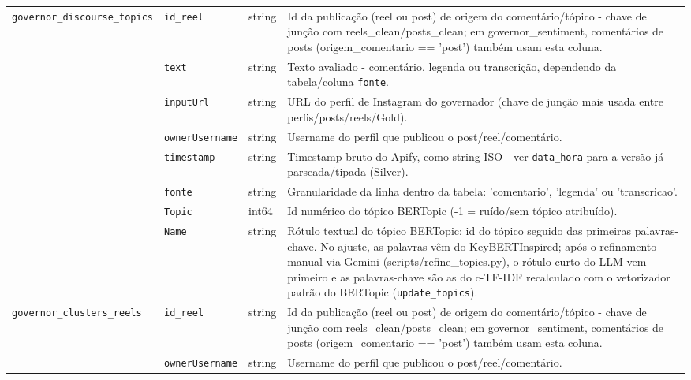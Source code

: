 \begin{footnotesize}
\begin{longtable}{p{3.2cm}p{3.0cm}p{2.0cm}p{6.0cm}}
\texttt{governor\_\allowbreak{}discourse\_\allowbreak{}topics} & \texttt{id\_\allowbreak{}reel} & string & Id da publicação (reel ou post) de origem do comentário/\allowbreak{}tópico - chave de junção com reels\_\allowbreak{}clean/\allowbreak{}posts\_\allowbreak{}clean; em governor\_\allowbreak{}sentiment, comentários de posts (origem\_\allowbreak{}comentario == 'post') também usam esta coluna. \\
\texttt{} & \texttt{text} & string & Texto avaliado - comentário, legenda ou transcrição, dependendo da tabela/\allowbreak{}coluna \texttt{fonte}. \\
\texttt{} & \texttt{inputUrl} & string & URL do perfil de Instagram do governador (chave de junção mais usada entre perfis/\allowbreak{}posts/\allowbreak{}reels/\allowbreak{}Gold). \\
\texttt{} & \texttt{ownerUsername} & string & Username do perfil que publicou o post/\allowbreak{}reel/\allowbreak{}comentário. \\
\texttt{} & \texttt{timestamp} & string & Timestamp bruto do Apify, como string ISO - ver \texttt{data\_\allowbreak{}hora} para a versão já parseada/\allowbreak{}tipada (Silver). \\
\texttt{} & \texttt{fonte} & string & Granularidade da linha dentro da tabela: 'comentario', 'legenda' ou 'transcricao'. \\
\texttt{} & \texttt{Topic} & int64 & Id numérico do tópico BERTopic (-1 = ruído/\allowbreak{}sem tópico atribuído). \\
\texttt{} & \texttt{Name} & string & Rótulo textual do tópico BERTopic: id do tópico seguido das primeiras palavras-chave. No ajuste, as palavras vêm do KeyBERTInspired; após o refinamento manual via Gemini (scripts/\allowbreak{}refine\_\allowbreak{}topics.py), o rótulo curto do LLM vem primeiro e as palavras-chave são as do c-TF-IDF recalculado com o vetorizador padrão do BERTopic (\texttt{update\_\allowbreak{}topics}). \\
\texttt{governor\_\allowbreak{}clusters\_\allowbreak{}reels} & \texttt{id\_\allowbreak{}reel} & string & Id da publicação (reel ou post) de origem do comentário/\allowbreak{}tópico - chave de junção com reels\_\allowbreak{}clean/\allowbreak{}posts\_\allowbreak{}clean; em governor\_\allowbreak{}sentiment, comentários de posts (origem\_\allowbreak{}comentario == 'post') também usam esta coluna. \\
\texttt{} & \texttt{ownerUsername} & string & Username do perfil que publicou o post/\allowbreak{}reel/\allowbreak{}comentário. \\

\end{longtable}
\end{footnotesize}
